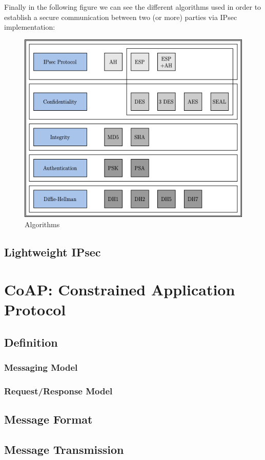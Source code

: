 \documentclass[11pt]{book}
\begin{document}
Finally in the following figure we can see the different algorithms used in order to establish a secure communication between two (or more) parties via IPsec implementation:
\begin{figure}[H]
	\centering
	\includegraphics [scale=0.5] {summary.png}
	\caption{Algorithms}
\end{figure}
\section{Lightweight IPsec}
\chapter{CoAP: Constrained Application Protocol}
\section{Definition}
\subsection{Messaging Model}
\subsection{Request/Response Model}
\section{Message Format}
\section{Message Transmission}
\end{document}
